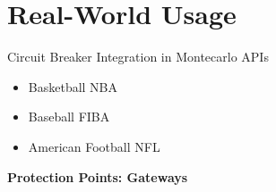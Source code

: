 \documentclass[aspectratio=169]{beamer}
\begin{document}
\section{Real-World Usage}

\begin{frame}{Circuit Breaker Integration in Montecarlo APIs}
    \begin{center}
        \begin{itemize}
         \item Basketball NBA
         \item Baseball FIBA
         \item American Football NFL
              
        \end{itemize}
    \end{center}
    
    \textbf{Protection Points: Gateways}
\end{frame}
\end{document}
